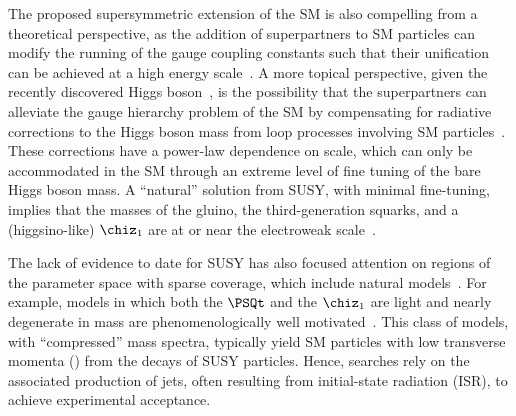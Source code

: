 The proposed supersymmetric extension of the SM is also compelling
from a theoretical perspective, as the addition of superpartners to SM
particles can modify the running of the gauge coupling constants such
that their unification can be achieved at a high energy
scale~\cite{Dimopoulos:1981yj, Ibanez:1981yh, Marciano:1981un}. A
more topical perspective, given the recently discovered Higgs
boson~\cite{ref:atlashiggsdiscovery, ref:cmshiggsdiscovery,
  ref:cmshiggsdiscoverylong}, is the possibility that the
superpartners can alleviate the gauge hierarchy problem of the SM by
compensating for radiative corrections to the Higgs boson mass from
loop processes involving SM particles~\cite{ref:hierarchy1,
  ref:hierarchy2}. These corrections have a power-law dependence on
scale, which can only be accommodated in the SM through an extreme
level of fine tuning of the bare Higgs boson mass. 
A ``natural'' solution from SUSY, with minimal fine-tuning, implies
that the masses of the gluino, the third-generation squarks, and a
(higgsino-like) $\chiz_1$ are at or near the electroweak
scale~\cite{ref:barbierinsusy}.

The lack of evidence to date for SUSY has also focused attention on
regions of the parameter space with sparse coverage, which include
natural models~\cite{Delgado:2012eu, Boehm:1999tr, Carena:2008mj,
  Grober:2014aha, Grober:2015fia}. For example, models in which both
the $\PSQt$ and the $\chiz_1$ are light and nearly degenerate in mass
are phenomenologically well motivated~\cite{Boehm:1999bj,
  Balazs:2004bu, Martin:2007gf, Martin:2007hn}. This class of models,
with ``compressed'' mass spectra, typically yield SM particles with
low transverse momenta (\Pt) from the decays of SUSY particles. Hence,
searches rely on the associated production of jets, often resulting
from initial-state radiation (ISR), to achieve experimental
acceptance.

